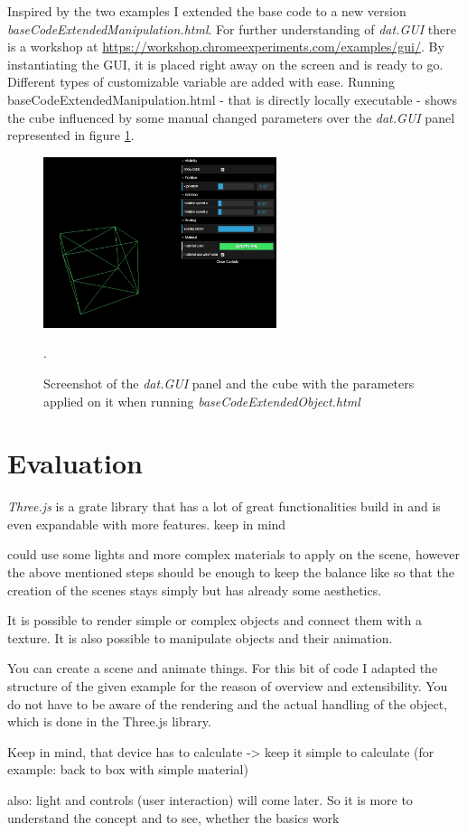 Inspired by the two examples I extended the base code to a new version \textit{baseCodeExtendedManipulation.html}. For further understanding of \textit{dat.GUI} there is a workshop at \url{https://workshop.chromeexperiments.com/examples/gui/}. By instantiating the GUI, it is placed right away on the screen and is ready to go. Different types of customizable variable are added with ease. Running {baseCodeExtendedManipulation.html} - that is directly locally executable - shows the cube influenced by some manual changed parameters over the \textit{dat.GUI} panel represented in figure \ref{fig:cube and panel}.

\begin{figure}[h]
    \centering
    \includegraphics[height=5cm]{Document/Figures/chapter2/ScreenshotManipulation.jpg}
    \caption[Screenshot of the \textit{dat.GUI} panel and the cube]{Screenshot of the \textit{dat.GUI} panel and the cube with the parameters applied on it when running \mbox{\textit{baseCodeExtendedObject.html}}}.
    \label{fig:cube and panel}
\end{figure}

\section{Evaluation}

\textit{Three.js} is a grate library that has a lot of great functionalities build in and is even expandable with more features.
keep in mind

could use some lights and more complex materials to apply on the scene, however the above mentioned steps should be enough to keep the balance like so that the creation of the scenes stays simply but has already some aesthetics.

It is possible to render simple or complex objects and connect them with a texture. It is also possible to manipulate objects and their animation.

You can create a scene and animate things. For this bit of code I adapted the structure of the given example for the reason of overview and extensibility. You do not have to be aware of the rendering and the actual handling of the object, which is done in the Three.js library.

Keep in mind, that device has to calculate -> keep it simple to calculate (for example: back to box with simple material)

also: light and controls (user interaction) will come later.
So it is more to understand the concept and to see, whether the basics work
